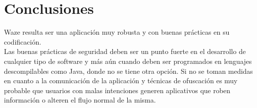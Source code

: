 \documentclass[12pt]{article}
\begin{document}
\section{Conclusiones}
Waze resulta ser una aplicación muy robusta y con buenas prácticas en su codificación. 
\\

Las buenas prácticas de seguridad deben ser un punto fuerte en el desarrollo de cualquier tipo de software y más aún cuando deben ser programados en lenguajes descompilables como Java, donde no se tiene otra opción. Si no se toman medidas en cuanto a la comunicación de la aplicación y técnicas de ofuscación es muy probable que usuarios con malas intenciones generen aplicativos que roben información o alteren el flujo normal de la misma.
\end{document}
